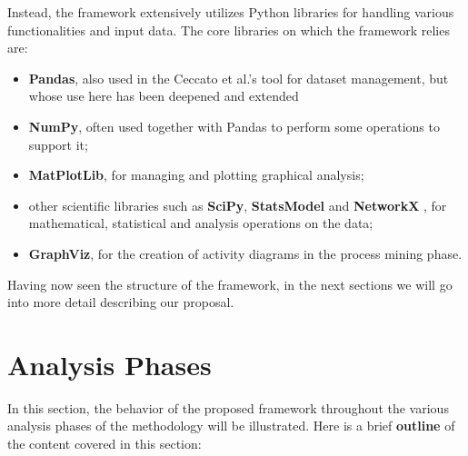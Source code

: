 \bigskip
Instead, the framework extensively utilizes Python libraries for handling various functionalities and input data. The core libraries on which the framework relies are:

\begin{itemize}
	\item \textbf{Pandas}, also used in the Ceccato et al.'s tool for dataset management, but whose use here has been deepened and extended	
	\item \textbf{NumPy}, often used together with Pandas to perform some operations to support it;
	
	\item \textbf{MatPlotLib}, for managing and plotting graphical analysis;
	
	\item other scientific libraries such as \textbf{SciPy}, \textbf{StatsModel} \cite{statsmodel} and \textbf{NetworkX} \cite{networkx}, for mathematical, statistical and analysis operations on the data;
	
	\item \textbf{GraphViz}, for the creation of activity diagrams in the process mining phase.
\end{itemize}
Having now seen the structure of the framework, in the next sections we will go into more detail describing our proposal.

\section{Analysis Phases}
\label{sec:4_analysis_phases}
In this section, the behavior of the proposed framework throughout the various analysis phases of the methodology will be illustrated. Here is a brief \textbf{outline} of the content covered in this section:

